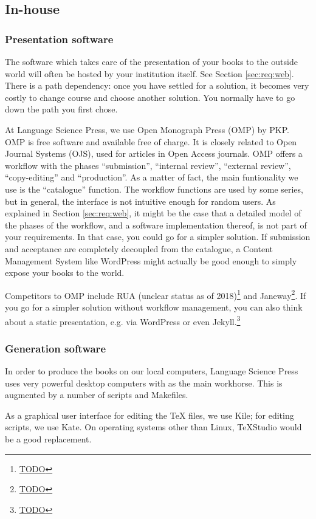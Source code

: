 \documentclass[guidelines,nonflat,modfonts] {langsci/langscibook}
\newcommand{\footurl}[1]{\footnote{\url{#1}}}
\begin{document}
\subsection{In-house}
\subsubsection{Presentation software}
The software which takes care of the presentation of your books to the outside world will often be hosted by your institution itself. See Section \ref{sec:req:web}. There is a path dependency: once you have settled for a solution, it becomes very costly to change course and choose another solution. You normally have to go down the path you first chose. 

At Language Science Press, we use Open Monograph Press (OMP) by PKP. OMP is free software and available free of charge. It is closely related to Open Journal Systems (OJS), used for articles in Open Access journals. OMP offers a workflow with the phases ``submission'', ``internal review'', ``external review'', ``copy-editing'' and ``production''. As a matter of fact, the main funtionality we use is the ``catalogue'' function. The workflow functions are used by some series, but in general, the interface is not intuitive enough for random users. As explained in Section \ref{sec:req:web}, it might be the case that a detailed model of the phases of the workflow, and a software implementation thereof, is not part of your requirements. In that case, you could go for a simpler solution. If submission and acceptance are completely decoupled from the catalogue, a Content Management System like WordPress might actually be good enough to simply expose your books to the world. 

Competitors to OMP include RUA (unclear status as of 2018)\footurl{TODO} and Janeway\footurl{TODO}. If you go for a simpler solution without workflow management, you can also think about a static presentation, e.g. via WordPress or even Jekyll.\footurl{TODO} 

\subsubsection{Generation software}
In order to produce the books on our local computers, Language Science Press uses very powerful desktop computers with \xelatex as the main workhorse. This is augmented by a number of scripts and Makefiles. 

As a graphical user interface for editing the TeX files, we use Kile; for editing scripts, we use Kate. On operating systems other than Linux, TeXStudio would be a good replacement. 
\end{document}
